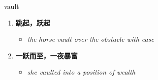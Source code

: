
\begin{frame}
{\huge vault}
\begin{center}
\begin{enumerate}\Large
  \item \textbf{跳起，跃起}
  \begin{itemize}
    \item \em{\Large{the horse vault over the obstacle with ease}}
  \end{itemize}
  \item \textbf{一跃而至，一夜暴富}
  \begin{itemize}
    \item \em{\Large{she vaulted into a position of wealth}}
  \end{itemize}
\end{enumerate}
\end{center}
\end{frame}
